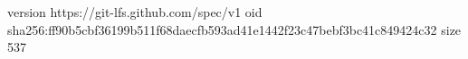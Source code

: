 version https://git-lfs.github.com/spec/v1
oid sha256:ff90b5cbf36199b511f68daecfb593ad41e1442f23c47bebf3bc41c849424c32
size 537
